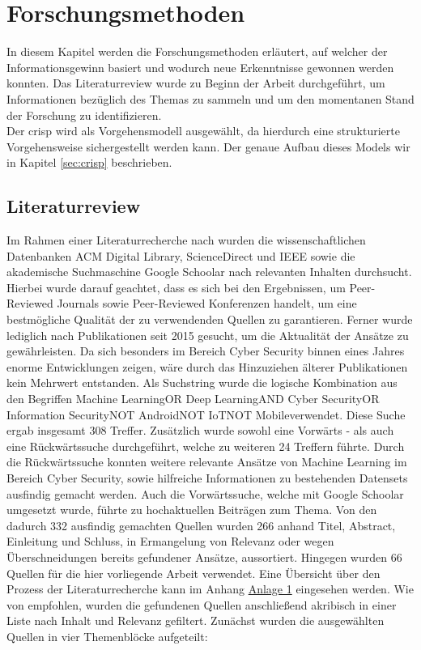 \documentclass[
    12pt, %
    DIV10,
    ngerman, %
    a4paper, %
    oneside, %
    titlepage, %
    parskip=half, %
    headings=normal, %
    listof=totoc, %
    bibliography=totoc, %
    index=totoc, %
    captions=tableheading, %
    final %
]{scrreprt}
\begin{document}
\chapter{Forschungsmethoden}
In diesem Kapitel werden die Forschungsmethoden erläutert, auf welcher der Informationsgewinn basiert und wodurch neue Erkenntnisse gewonnen werden konnten. Das Literaturreview wurde zu Beginn der Arbeit durchgeführt, um Informationen bezüglich des Themas zu sammeln und um den momentanen Stand der Forschung zu identifizieren.\\
Der \ac{crisp} wird als Vorgehensmodell ausgewählt, da hierdurch eine strukturierte Vorgehensweise sichergestellt werden kann. Der genaue Aufbau dieses Models wir in Kapitel \ref{sec:crisp} beschrieben.
\section{Literaturreview}
\label{sec:lr}
Im Rahmen einer Literaturrecherche nach \citeauthor{Webster2002} wurden die wissenschaftlichen Datenbanken ACM Digital Library, ScienceDirect und IEEE sowie die akademische Suchmaschine Google Schoolar nach relevanten Inhalten durchsucht. Hierbei wurde darauf geachtet, dass es sich bei den Ergebnissen, um Peer-Reviewed Journals sowie Peer-Reviewed Konferenzen handelt, um eine bestmögliche Qualität der zu verwendenden Quellen zu garantieren. Ferner wurde lediglich nach Publikationen seit 2015 gesucht, um die Aktualität der Ansätze zu gewährleisten. Da sich besonders im Bereich Cyber Security binnen eines Jahres enorme Entwicklungen zeigen, wäre durch das Hinzuziehen älterer Publikationen kein Mehrwert entstanden. Als Suchstring wurde die logische Kombination aus den Begriffen \glqq Machine Learning\grqq OR \glqq Deep Learning\grqq AND \glqq Cyber Security\grqq OR \glqq Information Security\grqq NOT \glqq Android\grqq NOT \glqq IoT\grqq NOT \glqq Mobile\grqq verwendet. Diese Suche ergab insgesamt 308 Treffer. Zusätzlich wurde sowohl eine Vorwärts - als auch eine Rückwärtssuche durchgeführt, welche zu weiteren 24 Treffern führte. Durch die Rückwärtssuche konnten weitere relevante Ansätze von Machine Learning im Bereich Cyber Security, sowie hilfreiche Informationen zu bestehenden Datensets ausfindig gemacht werden. Auch die Vorwärtssuche, welche mit Google Schoolar umgesetzt wurde, führte zu hochaktuellen Beiträgen zum Thema. Von den dadurch 332 ausfindig gemachten Quellen wurden 266 anhand Titel, Abstract, Einleitung und Schluss, in Ermangelung von Relevanz oder wegen Überschneidungen bereits gefundener Ansätze, aussortiert. Hingegen wurden 66 Quellen für die hier vorliegende Arbeit verwendet. Eine Übersicht über den Prozess der Literaturrecherche kann im Anhang \hyperref[rm]{Anlage 1} eingesehen werden. Wie von \citeauthor{Webster2002} empfohlen, wurden die gefundenen Quellen anschließend akribisch in einer Liste nach Inhalt und Relevanz gefiltert. Zunächst wurden die ausgewählten Quellen in vier Themenblöcke aufgeteilt:
\end{document}
